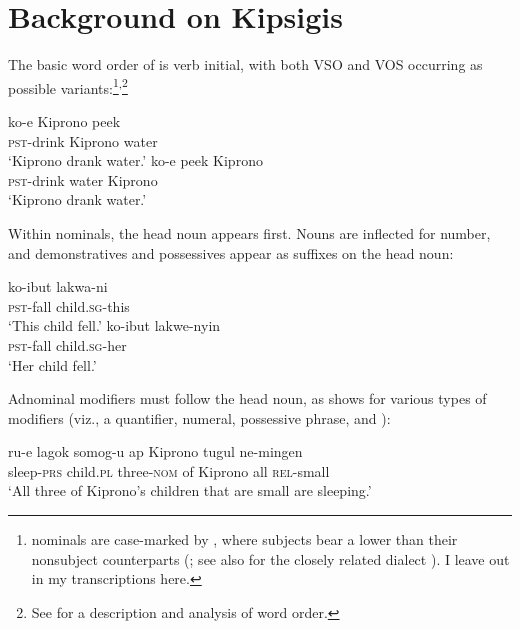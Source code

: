 \documentclass[output=paper]{LSP/langsci}
\begin{document}
\section{Background on Kipsigis}\label{sec:landman:background} 

The basic word order of  is verb initial, with both VSO and VOS occurring as possible variants:\footnote{ nominals are case-marked by , where subjects bear a lower  than their nonsubject counterparts (\citealt{Jake:1979}; see also \citealt{Creider:1989,Creider:2003} for the closely related dialect ). I leave out  in my transcriptions here.}\textsuperscript{,}\footnote{See \citealt{Diercks:2016b} for a description and analysis of  word order.} 

\ea
  \settowidth{}  
  \ea \gll	ko-e Kiprono peek\\
			\textsc{pst}-drink Kiprono water\\ 
      \glt ‘Kiprono drank water.’\label{ex:landman:VSO}
  \ex \gll ko-e peek Kiprono\\
           \textsc{pst}-drink water Kiprono\\ 
      \glt ‘Kiprono drank water.’\label{ex:landman:VOS}
  \z
\z
 
Within nominals, the head noun appears first. Nouns are inflected for number, and demonstratives  and possessives  appear as suffixes on the head noun:

\ea
  \settowidth{}  
  \ea \label{ex:landman:6a}
    \gll ko-ibut lakwa-ni \\
      \textsc{pst}-fall child.\textsc{sg}-this\\                 
      \glt ‘This child fell.’
  \ex\label{ex:landman:6b}
    \gll ko-ibut lakwe-nyin \\
      \textsc{pst}-fall child.\textsc{sg}-her\\                   
      \glt ‘Her child fell.’
  \z
\z 

\noindent Adnominal modifiers must follow the head noun, as  shows for various types of modifiers (viz., a quantifier, numeral, possessive phrase, and ): 

\ea \label{ex:landman:7a}
  \gll ru-e lagok somog-u ap Kiprono tugul ne-mingen\\
       sleep-\textsc{prs} child.\textsc{pl} three-\textsc{nom} of Kiprono all \textsc{rel}-small\\
  \glt ‘All three of Kiprono's children that are small are sleeping.’
\z
\end{document}
